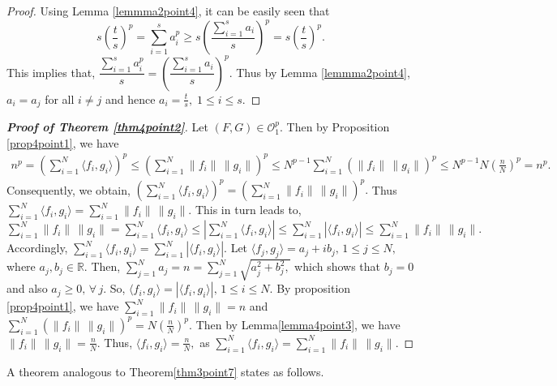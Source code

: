 \documentclass[final,1p,times]{elsarticle}
\begin{document}
\begin{proof}
	Using Lemma \ref{lemmma2point4}, it can be easily seen that
	$$s\left(\frac{t}{s}  \right)^p =  \sum\limits_{i=1}^s a^{p}_i \geq s \left(\frac{\sum\limits_{i=1}^s a_i}{s}\right)^p = s\left(\frac{t}{s}  \right)^p.$$ 
	This implies that, $\dfrac{\sum\limits_{i=1}^s a^{p}_i}{s} = \left(\dfrac{\sum\limits_{i=1}^s a_i}{s}\right)^p . $ Thus by Lemma \ref{lemmma2point4}, $a_i = a_j $ for all $i \neq j$ and hence $a_i = \frac{t}{s},\;1 \leq i \leq s.$
\end{proof}









\begin{proof}[\textbf{Proof of Theorem \ref{thm4point2}}]
	Let $(F,G) \in \mathcal{O}_{1}^p .$ Then by Proposition \ref{prop4point1}, we have
	\begin{align*}
		n^p = \left(\sum\limits_{i=1}^N \langle f_i, g_i \rangle \right)^p \leq \left(\sum\limits_{i=1}^N \| f_i\| \, \|g_i \| \right)^p \leq N^{p-1} \sum\limits_{i=1}^N \left( \| f_i\| \, \|g_i \| \right)^p \leq N^{p-1} N \left(\frac{n}{N}\right)^p = n^p.
	\end{align*} 
Consequently, we obtain, $\left(\sum\limits_{i=1}^N \langle f_i, g_i \rangle \right)^p = \left(\sum\limits_{i=1}^N \| f_i\| \, \|g_i \| \right)^p .$ Thus $\sum\limits_{i=1}^N \langle f_i, g_i \rangle = \sum\limits_{i=1}^N \| f_i\| \, \|g_i \| .$ This in turn leads to, $\sum\limits_{i=1}^N \| f_i\| \, \|g_i \| = \sum\limits_{i=1}^N \langle f_i, g_i \rangle \leq \left| \sum\limits_{i=1}^N \langle f_i, g_i \rangle  \right|  \leq \sum\limits_{i=1}^N \left| \langle f_i, g_i \rangle \right| \leq \sum\limits_{i=1}^N \| f_i\| \, \|g_i \|.$ Accordingly, $\sum\limits_{i=1}^N \langle f_i, g_i \rangle = \sum\limits_{i=1}^N \left| \langle f_i, g_i \rangle \right|. $ Let $\langle f_j , g_j \rangle = a_j + ib_j,\, 1\leq j \leq N,$ where $a_j,b_j \in \mathbb{R}.$ Then, $\sum\limits_{j=1}^N a_j = n = \sum\limits_{j=1}^N \sqrt{a_j^2 +b_j^2,}$ which shows that $b_j = 0$  and also $a_j \geq 0,\, \forall\, j.$ So, $\langle f_i, g_i \rangle = \left| \langle f_i, g_i \rangle \right|,\,1\leq i \leq N.$ By proposition \ref{prop4point1}, we have $\sum\limits_{i=1}^N \| f_i\| \, \|g_i \| = n $ and $\sum\limits_{i=1}^N \left(\| f_i\| \, \|g_i \|\right)^p = N\left(\frac{n}{N} \right)^p.$ Then by Lemma\ref{lemma4point3}, we have $\| f_i\| \, \|g_i \|= \frac{n}{N}. $ Thus, $ \langle f_i, g_i \rangle = \frac{n}{N},$ as  $\sum\limits_{i=1}^N \langle f_i, g_i \rangle = \sum\limits_{i=1}^N \| f_i\| \, \|g_i \| .$
 \end{proof}
\noindent
A theorem analogous to Theorem\ref{thm3point7} states as follows.
\end{document}
